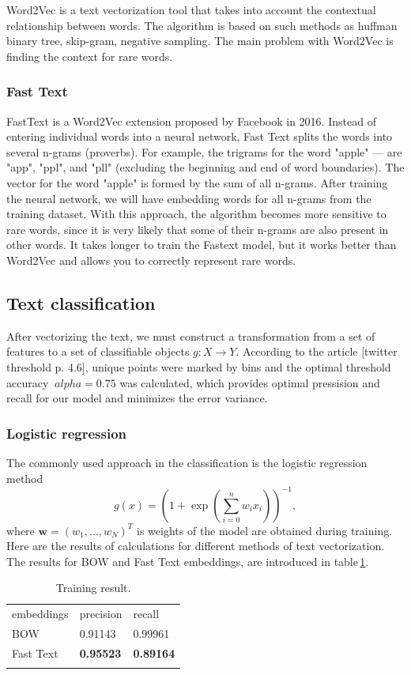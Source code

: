 \documentclass[12pt]{jpconf}
\begin{document}
Word2Vec is a text vectorization tool that takes into account the contextual relationship between words. The algorithm is based on such methods as huffman binary tree, skip-gram, negative sampling. The main problem with Word2Vec is finding the context for rare words.

\subsubsection{Fast Text}
FastText is a Word2Vec extension proposed by Facebook in 2016. Instead of entering individual words into a neural network, Fast Text splits the words into several n-grams (proverbs). For example, the trigrams for the word "apple" --- are "app", "ppl", and "pll" (excluding the beginning and end of word boundaries). The vector for the word "apple" is formed by the sum of all n-grams. After training the neural network, we will have embedding words for all n-grams from the training dataset.
With this approach, the algorithm becomes more sensitive to rare words, since it is very likely that some of their n-grams are also present in other words. It takes longer to train the Fastext model, but it works better than Word2Vec and allows you to correctly represent rare words.

\subsection{Text classification}
After vectorizing the text, we must construct a transformation from a set of features to a set of classifiable objects $g: X \rightarrow Y.$
According to the article [twitter threshold p. 4.6], unique points were marked by bins and the optimal threshold accuracy $ \ alpha = 0.75$ was calculated, which provides optimal pressision and recall for our model and minimizes the error variance.

\subsubsection{Logistic regression}
The commonly used approach in the classification is the logistic regression method
$$
g(x) = \left(1 + \exp{ \left( \sum_{i=0}^n w_i x_i  \right) }\right)^{-1},
$$
where $\mathbf{w}=(w_1,\ldots, w_N)^T$ is weights of the model are obtained during training.
Here are the results of calculations for different methods of text vectorization.
The results for BOW and Fast Text embeddings, are introduced in table\,\ref{tbl:01}.
\begin{table}
	\centering
	\caption{\label{tbl:01}Training result.}
	\begin{center}
		\begin{tabular}{lll}
			\br
			embeddings & precision & recall \\
			\mr
			BOW & 0.91143 & 0.99961 \\ \hline
			Fast Text & \bf 0.95523 & \bf 0.89164 \\ 
			\br
		\end{tabular}
	\end{center}
\end{table}
\end{document}
